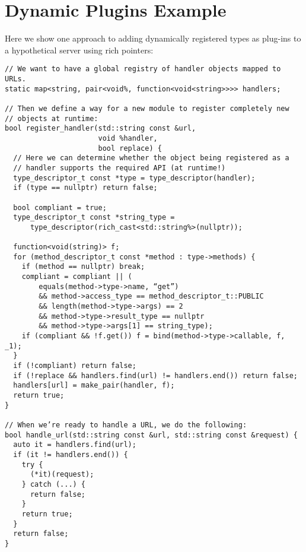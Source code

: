 \section{Dynamic Plugins Example}
\label{appendix:plugins-example}

Here we show one approach to adding dynamically registered types as plug-ins to
a hypothetical server using rich pointers:

\begin{verbatim}
// We want to have a global registry of handler objects mapped to URLs.
static map<string, pair<void%, function<void<string>>>> handlers;

// Then we define a way for a new module to register completely new
// objects at runtime:
bool register_handler(std::string const &url,
                      void %handler,
                      bool replace) {
  // Here we can determine whether the object being registered as a
  // handler supports the required API (at runtime!)
  type_descriptor_t const *type = type_descriptor(handler);
  if (type == nullptr) return false;

  bool compliant = true;
  type_descriptor_t const *string_type =
      type_descriptor(rich_cast<std::string%>(nullptr));

  function<void(string)> f;
  for (method_descriptor_t const *method : type->methods) {
    if (method == nullptr) break;
    compliant = compliant || (
        equals(method->type->name, “get”)
        && method->access_type == method_descriptor_t::PUBLIC
        && length(method->type->args) == 2
        && method->type->result_type == nullptr
        && method->type->args[1] == string_type);
    if (compliant && !f.get()) f = bind(method->type->callable, f, _1);
  }
  if (!compliant) return false;
  if (!replace && handlers.find(url) != handlers.end()) return false;
  handlers[url] = make_pair(handler, f);
  return true;
}

// When we’re ready to handle a URL, we do the following:
bool handle_url(std::string const &url, std::string const &request) {
  auto it = handlers.find(url);
  if (it != handlers.end()) {
    try {
      (*it)(request);
    } catch (...) {
      return false;
    }
    return true;
  }
  return false;
}
\end{verbatim}


